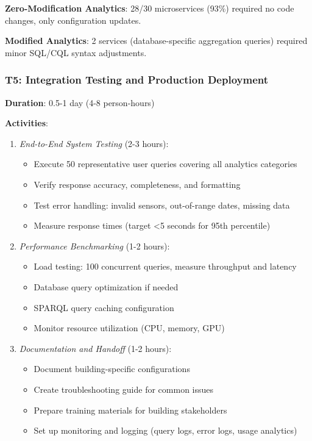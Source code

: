 \documentclass[acmlarge]{acmart}
\begin{document}
\textbf{Zero-Modification Analytics}: 28/30 microservices (93\%) required no code changes, only configuration updates.

\textbf{Modified Analytics}: 2 services (database-specific aggregation queries) required minor SQL/CQL syntax adjustments.

\subsubsection{T5: Integration Testing and Production Deployment}

\textbf{Duration}: 0.5-1 day (4-8 person-hours)

\textbf{Activities}:
\begin{enumerate}
    \item \textit{End-to-End System Testing} (2-3 hours):
    \begin{itemize}
        \item Execute 50 representative user queries covering all analytics categories
        \item Verify response accuracy, completeness, and formatting
        \item Test error handling: invalid sensors, out-of-range dates, missing data
        \item Measure response times (target <5 seconds for 95th percentile)
    \end{itemize}
    
    \item \textit{Performance Benchmarking} (1-2 hours):
    \begin{itemize}
        \item Load testing: 100 concurrent queries, measure throughput and latency
        \item Database query optimization if needed
        \item SPARQL query caching configuration
        \item Monitor resource utilization (CPU, memory, GPU)
    \end{itemize}
    
    \item \textit{Documentation and Handoff} (1-2 hours):
    \begin{itemize}
        \item Document building-specific configurations
        \item Create troubleshooting guide for common issues
        \item Prepare training materials for building stakeholders
        \item Set up monitoring and logging (query logs, error logs, usage analytics)
    \end{itemize}
\end{enumerate}
\end{document}

